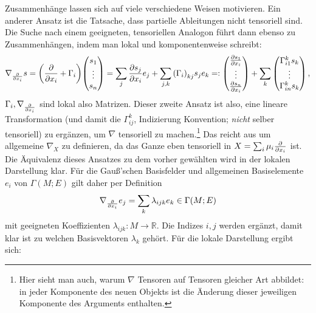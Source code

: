 Zusammenhänge lassen sich auf viele verschiedene Weisen motivieren. Ein anderer Ansatz ist die Tatsache, dass partielle Ableitungen nicht tensoriell sind. Die Suche nach einem geeigneten, tensoriellen Analogon führt dann ebenso zu Zusammenhängen, indem man lokal und komponentenweise schreibt:
\begin{equation}
\nabla_{\pdv{x_i}} s = \qty(\pdv{x_i} + \Gamma_i) \mqty(s_1 \\ \vdots \\ s_n) = \sum_j \pdv{s_j}{x_i} e_j + \sum_{j, k} \qty(\Gamma_i)_{kj} s_j e_k =: \mqty(\pdv{s_1}{x_i} \\ \vdots \\ \pdv{s_n}{x_i}) + \sum_k \mqty(\Gamma_{i1}^k s_k \\ \vdots \\ \Gamma_{in}^k s_k) \, ,
\end{equation}
$\Gamma_i, \nabla_{\pdv{x_i}}$ sind lokal also Matrizen. %
Dieser zweite Ansatz ist also, eine lineare Transformation (und damit die  $\Gamma_{ij}^k$, Indizierung Konvention; \emph{nicht} selber tensoriell) zu ergänzen, um $\nabla$ tensoriell zu machen.\footnote{Hier sieht man auch, warum $\nabla$ Tensoren auf Tensoren gleicher Art abbildet: in jeder Komponente des neuen Objekts ist die Änderung dieser jeweiligen Komponente des Arguments enthalten.} Das reicht aus um allgemeine $\nabla_X$ zu definieren, da das Ganze eben tensoriell in $X = \sum_i \mu_i \pdv{x_i}$ ist. Die Äquivalenz dieses Ansatzes zu dem vorher gewählten wird in der lokalen Darstellung klar. Für die Gauß'schen Basisfelder und allgemeinen Basiselemente $e_i$ von $\Gamma(M; E)$ gilt daher per Definition
\begin{equation}
\nabla_{\pdv{x_i}} e_j = \sum_k \lambda_{ijk} e_k \in \Gamma(M; E)
\end{equation}
mit geeigneten Koeffizienten $\lambda_{ijk}: M \rightarrow \mathbb{R}$. Die Indizes $i, j$ werden ergänzt, damit klar ist zu welchen Basisvektoren $\lambda_k$ gehört. Für die lokale Darstellung ergibt sich:
